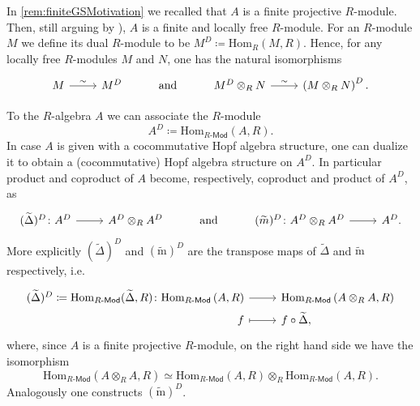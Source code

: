 \documentclass[../Main]{subfiles}
\begin{document}
\begin{rem}[]
	In \cref{rem:finiteGSMotivation} we recalled that $A$ is a finite projective $R$-module.
	Then, still arguing by
	\cite[\href{https://stacks.math.columbia.edu/tag/00NX}{Lemma 00NX}]{SP}),
	$A$ is a finite and locally free $R$-module.
	For an $R$-module $M$ we define its dual $R$-module to be
	$M^D \coloneqq \mathrm{Hom}_{R} \left( M, R \right)$.
	Hence, for any locally free $R$-modules $M$ and $N$,
	one has the natural isomorphisms
	\begin{equation*}
	\begin{tikzcd}
		M \arrow[r, "\sim", rightarrow] &
		M^D &
		\text{and} &
		M^D \otimes_R N \arrow[r, "\sim", rightarrow] &
		\left( M \otimes_R N \right)^D
	.\end{tikzcd}
	\end{equation*}
\end{rem}


\begin{rem}
	To the $R$-algebra $A$ we can associate the $R$-module 
	\begin{equation*}
	A^D \coloneqq \mathrm{Hom}_{ R\text{-}\mathsf{Mod} } \left( A, R \right)
	.\end{equation*} 
	In case $A$ is given with a cocommutative Hopf algebra structure, one
	can dualize it to obtain a (cocommutative) Hopf algebra structure on $A^D$.
	In particular product and coproduct of $A$ become, respectively,
	coproduct and product of $A^D$, as
	\begin{equation*}
	\begin{tikzcd}
		(\widetilde{\Delta})^D\colon
		A^D \arrow[r, "", rightarrow] &
		A^D \otimes_R A^D &
		\text{\text{and}} &
		(\widetilde{m})^D\colon
		A^D \otimes_R A^D \arrow[r, "", rightarrow] &
		A^D 
	.\end{tikzcd}
	\end{equation*}
	More explicitly $(\widetilde{\Delta})^D$ and $(\widetilde{\mathrm{m}})^D$ are
	the transpose maps of $\widetilde{\Delta}$ and $\widetilde{\mathrm{m}}$ respectively,
	i.e.
	\begin{equation*}
	\begin{tikzcd}[row sep = 0ex
		,/tikz/column 1/.append style={anchor=base east}
		,/tikz/column 2/.append style={anchor=base west}]
		(\widetilde{\Delta})^D \coloneqq \mathrm{Hom}_{ R\text{-}\mathsf{Mod} }
		( \widetilde{\Delta}, R )
		\colon \mathrm{Hom}_{ R\text{-}\mathsf{Mod} } \left( A, R \right)\arrow[r, "", rightarrow] &
		\mathrm{Hom}_{ R\text{-}\mathsf{Mod} } \left( A \otimes_R A, R \right)\\
		f \arrow[r, "", mapsto] & f \circ \widetilde{\Delta}
	,\end{tikzcd}
	\end{equation*} 
	where, since $A$ is a finite projective $R$-module, 
	on the right hand side we have the isomorphism
	\begin{equation*}
	\mathrm{Hom}_{ R\text{-}\mathsf{Mod} } \left( A \otimes_R A, R \right) \simeq
	\mathrm{Hom}_{ R\text{-}\mathsf{Mod} } \left( A, R \right) \otimes_R
	\mathrm{Hom}_{ R\text{-}\mathsf{Mod} } \left( A, R \right)
	.\end{equation*}
	Analogously one constructs $(\widetilde{\mathrm{m}})^D$.
\end{rem}
\end{document}
